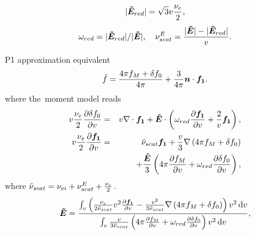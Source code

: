 \begin{equation}
  |\boldsymbol{\tilde{E}}_{red}| = \sqrt{3} v\frac{\nu_{e}}{2} ,
  \label{eq:Elimit}
\end{equation}
\begin{equation}
  \omega_{red} = |\boldsymbol{\tilde{E}}_{red}| / |\boldsymbol{\tilde{E}}| ,\quad 
  \nu_{scat}^E = \frac{|\boldsymbol{\tilde{E}}| - |\boldsymbol{\tilde{E}}_{red}|}{v} .
  \nonumber
\end{equation}

P1 approximation equivalent
\begin{equation}
  \tilde{f} = \frac{4\pi f_M + \delta f_0}{4\pi} + \frac{3}{4\pi}\boldsymbol{n}\cdot\boldsymbol{f_1} .
  \label{eq:OOE_P1outofeq}
\end{equation}
where the~moment model reads
\begin{eqnarray}
  v \frac{\nu_{e}}{2}\frac{\partial{\delta f_0}}{\partial{v}} &=&
  v\nabla\cdot\boldsymbol{f_1} + \boldsymbol{\tilde{E}}\cdot\left(\omega_{red} \frac{\partial{\boldsymbol{f_1}}}{\partial{v}} 
  + \frac{2}{v}\boldsymbol{f_1}\right) , 
  \nonumber\\
  v\frac{\nu_{e}}{2}\frac{\partial{\boldsymbol{f_1}}}{\partial{v}} 
  &=& \tilde{\nu}_{scat}\boldsymbol{f_1} 
  + \frac{v}{3}\nabla\left(4\pi f_M + \delta f_0\right)
  \nonumber \\
  && 
  + \frac{\boldsymbol{\tilde{E}}}{3}\left(4\pi \frac{\partial{f_M}}{\partial{v}} 
  + \omega_{red} \frac{\partial{\delta f_0}}{\partial{v}} 
  \right) ,
  \nonumber
\end{eqnarray}
where $\tilde{\nu}_{scat} = \nu_{ei} + \nu_{scat}^E + \frac{\nu_{e}}{2}$.
\begin{equation}
  \boldsymbol{\tilde{E}} =
  \frac{\int_{v} \left(\frac{\nu_{e}}{2\tilde{\nu}_{scat}}v^2\frac{\partial{\boldsymbol{f_1}}}{\partial{v}}
  - \frac{v^2}{3\tilde{\nu}_{scat}}
  \nabla\left(4\pi f_M + \delta f_0\right)\right) v^2\, \text{d}v}
  {\int_{v} \frac{v}
  {3\tilde{\nu}_{scat}}
  \left(4\pi\frac{\partial{f_M}}{\partial{v}} + \omega_{red} \frac{\partial{\delta f_0}}{\partial{v}}\right)
  v^2\, \text{d}v} ,
  \nonumber
\end{equation}

